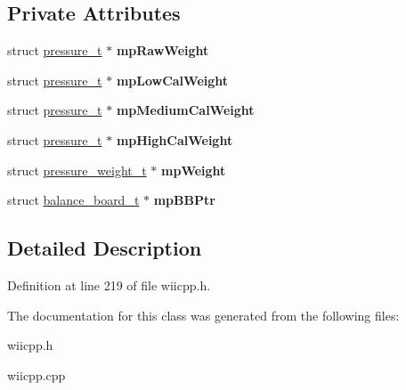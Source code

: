 \subsection*{Private Attributes}
\begin{DoxyCompactItemize}
\item 
\hypertarget{class_c_weight_sensor_ac8f520d14bebfce33404426e49a85098}{struct \hyperlink{structpressure__t}{pressure\-\_\-t} $\ast$ {\bfseries mp\-Raw\-Weight}}\label{class_c_weight_sensor_ac8f520d14bebfce33404426e49a85098}

\item 
\hypertarget{class_c_weight_sensor_a4a9a65f56da69d95fe60df5f73da16e8}{struct \hyperlink{structpressure__t}{pressure\-\_\-t} $\ast$ {\bfseries mp\-Low\-Cal\-Weight}}\label{class_c_weight_sensor_a4a9a65f56da69d95fe60df5f73da16e8}

\item 
\hypertarget{class_c_weight_sensor_a6f50ebe8c70c6feba0091bd205b2f8a6}{struct \hyperlink{structpressure__t}{pressure\-\_\-t} $\ast$ {\bfseries mp\-Medium\-Cal\-Weight}}\label{class_c_weight_sensor_a6f50ebe8c70c6feba0091bd205b2f8a6}

\item 
\hypertarget{class_c_weight_sensor_a13c39833afcf36fb3f7235a627523ff3}{struct \hyperlink{structpressure__t}{pressure\-\_\-t} $\ast$ {\bfseries mp\-High\-Cal\-Weight}}\label{class_c_weight_sensor_a13c39833afcf36fb3f7235a627523ff3}

\item 
\hypertarget{class_c_weight_sensor_a5ee5952ce915cf92efe5420bc201dd95}{struct \hyperlink{structpressure__weight__t}{pressure\-\_\-weight\-\_\-t} $\ast$ {\bfseries mp\-Weight}}\label{class_c_weight_sensor_a5ee5952ce915cf92efe5420bc201dd95}

\item 
\hypertarget{class_c_weight_sensor_a63d172119639b3385f432f86872cc926}{struct \hyperlink{structbalance__board__t}{balance\-\_\-board\-\_\-t} $\ast$ {\bfseries mp\-B\-B\-Ptr}}\label{class_c_weight_sensor_a63d172119639b3385f432f86872cc926}

\end{DoxyCompactItemize}


\subsection{Detailed Description}


Definition at line 219 of file wiicpp.\-h.



The documentation for this class was generated from the following files\-:\begin{DoxyCompactItemize}
\item 
wiicpp.\-h\item 
wiicpp.\-cpp\end{DoxyCompactItemize}
